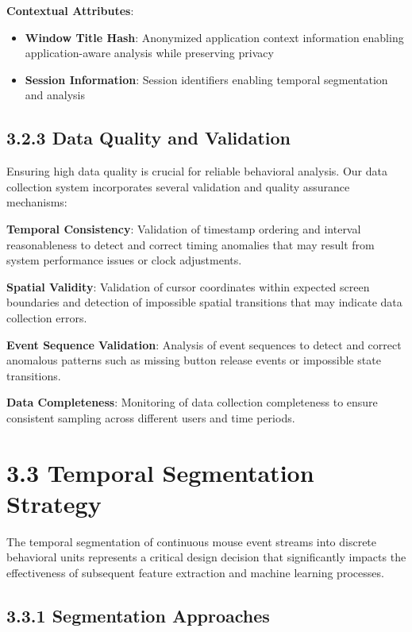 \documentclass[
  12pt,
  a4paper,
]{report}
\providecommand{\tightlist}{%
  \setlength{\itemsep}{0pt}\setlength{\parskip}{0pt}}
\begin{document}
\textbf{Contextual Attributes}:

\begin{itemize}
\tightlist
\item
  \textbf{Window Title Hash}: Anonymized application context information
  enabling application-aware analysis while preserving privacy
\item
  \textbf{Session Information}: Session identifiers enabling temporal
  segmentation and analysis
\end{itemize}

\subsection{3.2.3 Data Quality and
Validation}\label{data-quality-and-validation}

Ensuring high data quality is crucial for reliable behavioral analysis.
Our data collection system incorporates several validation and quality
assurance mechanisms:

\textbf{Temporal Consistency}: Validation of timestamp ordering and
interval reasonableness to detect and correct timing anomalies that may
result from system performance issues or clock adjustments.

\textbf{Spatial Validity}: Validation of cursor coordinates within
expected screen boundaries and detection of impossible spatial
transitions that may indicate data collection errors.

\textbf{Event Sequence Validation}: Analysis of event sequences to
detect and correct anomalous patterns such as missing button release
events or impossible state transitions.

\textbf{Data Completeness}: Monitoring of data collection completeness
to ensure consistent sampling across different users and time periods.

\section{3.3 Temporal Segmentation
Strategy}\label{temporal-segmentation-strategy}

The temporal segmentation of continuous mouse event streams into
discrete behavioral units represents a critical design decision that
significantly impacts the effectiveness of subsequent feature extraction
and machine learning processes.

\subsection{3.3.1 Segmentation
Approaches}\label{segmentation-approaches}
\end{document}
